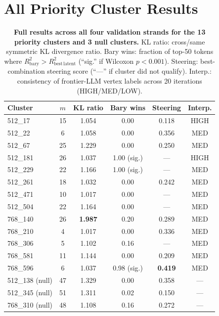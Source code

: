 \documentclass{article}
\begin{document}
\section{All Priority Cluster Results}
\label{app:all_results}

\begin{table}[h]
  \centering
  \caption{%
    \textbf{Full results across all four validation strands for the 13 priority clusters
    and 3 null clusters.}
    KL ratio: cross/same symmetric KL divergence ratio.
    Bary wins: fraction of top-50 tokens where $R^2_{\mathrm{bary}} > R^2_{\mathrm{best\,latent}}$
    (``sig.'' if Wilcoxon $p < 0.001$).
    Steering: best-combination steering score (``---'' if cluster did not qualify).
    Interp.: consistency of frontier-LLM vertex labels across 20 iterations
    (HIGH/MED/LOW).
  }
  \label{tab:full_results}
  \begin{tabular}{lccccc}
    \toprule
    Cluster & $m$ & KL ratio & Bary wins & Steering & Interp. \\
    \midrule
    512\_17   & 15 & 1.054 & 0.00       & 0.118 & HIGH \\
    512\_22   & 6  & 1.058 & 0.00       & 0.356 & MED \\
    512\_67   & 25 & 1.229 & 0.00       & 0.250 & MED \\
    512\_181  & 26 & 1.037 & 1.00 (sig.)& ---   & HIGH \\
    512\_229  & 22 & 1.166 & 1.00 (sig.)& ---   & MED \\
    512\_261  & 18 & 1.032 & 0.00       & 0.242 & MED \\
    512\_471  & 10 & 1.017 & 0.00       & ---   & MED \\
    512\_504  & 22 & 1.164 & 0.00       & ---   & MED \\
    768\_140  & 26 & \textbf{1.987} & 0.20 & 0.289 & MED \\
    768\_210  & 4  & 1.017 & 0.00       & 0.336 & MED \\
    768\_306  & 5  & 1.102 & 0.16       & ---   & MED \\
    768\_581  & 11 & 1.144 & 0.00       & 0.209 & MED \\
    768\_596  & 6  & 1.037 & 0.98 (sig.)& \textbf{0.419} & MED \\
    \midrule
    512\_138 (null) & 47 & 1.329 & 0.00 & 0.358 & --- \\
    512\_345 (null) & 51 & 1.311 & 0.02 & 0.150 & --- \\
    768\_310 (null) & 48 & 1.108 & 0.16 & 0.272 & --- \\
    \bottomrule
  \end{tabular}
\end{table}
\end{document}
